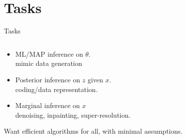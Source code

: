 \documentclass{beamer}
\begin{document}

\section{Tasks}


\begin{frame}{Tasks}
    \begin{columns}[T]
        \begin{column}{.7\textwidth}
            \begin{itemize}
                \item ML/MAP inference on $\theta$. \\
                \qquad mimic data generation
                \item Posterior inference on $z$ given $x$. \\
                \qquad coding/data representation.
                \item Marginal inference on $x$ \\
                \qquad denoising, inpainting, super-resolution.
            \end{itemize}
            Want efficient algorithms for all, with minimal assumptions.
        \end{column}

        \begin{column}{.2\textwidth}
        \end{column}
    \end{columns}
\end{frame}
\end{document}
